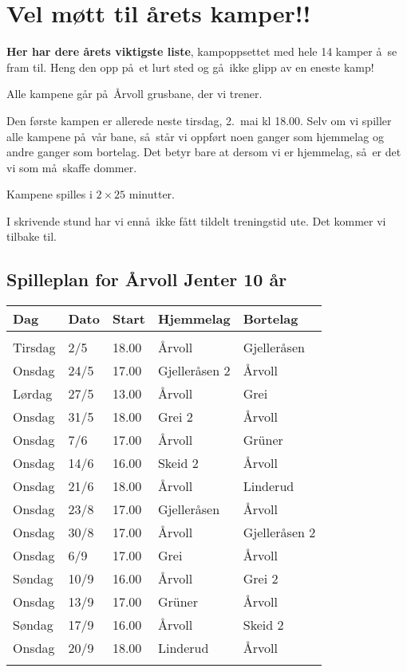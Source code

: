 \documentclass[12pt]{article}
\begin{document}
\pagestyle{empty}
\section*{Vel m\o tt til \aa rets kamper!!}

{\bf Her har dere \aa rets viktigste liste}, kampoppsettet
med hele 14 kamper \aa\ se fram til. Heng den opp
p\aa\ et lurt sted og g\aa\ ikke glipp av en eneste kamp!

Alle kampene g\aa r p\aa\ \AA rvoll grusbane, der vi trener.

Den f\o rste kampen er allerede neste tirsdag, 2.~mai kl 18.00.
Selv om vi spiller alle kampene p\aa\ v\aa r bane, s\aa\ st\aa r
vi oppf\o rt noen ganger som hjemmelag og andre ganger som bortelag.
Det betyr bare at dersom vi er hjemmelag, s\aa\ er det vi som m\aa\
skaffe dommer.

Kampene spilles i $2\times 25$ minutter.

I skrivende stund har vi enn\aa\ ikke f\aa tt tildelt
treningstid ute. Det kommer vi tilbake til. 

\subsection*{Spilleplan for \AA rvoll Jenter 10 \aa r}
\begin{table}[h]
\begin{center}
\begin{tabular}{lllll}\hline
{\bf Dag}&{\bf Dato}&{\bf Start}&{\bf Hjemmelag}&{\bf Bortelag}\\ \hline
& & & &\\
Tirsdag &2/5 &18.00  &\AA rvoll & Gjeller\aa sen \\
Onsdag &24/5 &17.00   & Gjeller\aa sen 2 &\AA rvoll \\
L\o rdag &27/5 &13.00  &\AA rvoll & Grei \\
Onsdag &31/5 &18.00   & Grei 2 &\AA rvoll\\
Onsdag &7/6 &17.00  &\AA rvoll & Gr\"uner \\
Onsdag &14/6 &16.00  & Skeid 2 &\AA rvoll\\
Onsdag &21/6 &18.00  &\AA rvoll & Linderud  \\
Onsdag &23/8 &17.00  &Gjeller\aa sen & \AA rvoll \\
Onsdag &30/8 &17.00  &\AA rvoll & Gjeller\aa sen 2 \\
Onsdag &6/9 &17.00  &Grei & \AA rvoll \\
S\o ndag &10/9 &16.00  &\AA rvoll & Grei 2\\
Onsdag &13/9 &17.00  &Gr\"uner & \AA rvoll\\
S\o ndag &17/9 &16.00  &\AA rvoll & Skeid 2\\
Onsdag &20/9 &18.00  & Linderud &\AA rvoll \\ 
& & & & \\ \hline
\end{tabular}
\end{center}
\end{table}
\end{document}
